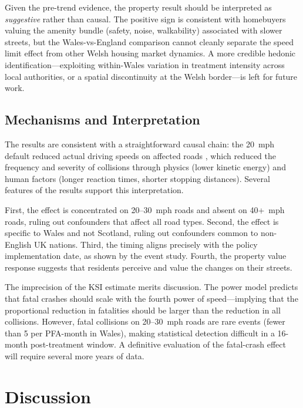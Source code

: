 \documentclass[12pt]{article}
\begin{document}
Given the pre-trend evidence, the property result should be interpreted as \textit{suggestive} rather than causal. The positive sign is consistent with homebuyers valuing the amenity bundle (safety, noise, walkability) associated with slower streets, but the Wales-vs-England comparison cannot cleanly separate the speed limit effect from other Welsh housing market dynamics. A more credible hedonic identification---exploiting within-Wales variation in treatment intensity across local authorities, or a spatial discontinuity at the Welsh border---is left for future work.

\subsection{Mechanisms and Interpretation}

The results are consistent with a straightforward causal chain: the 20~mph default reduced actual driving speeds on affected roads \citep{tfw2025}, which reduced the frequency and severity of collisions through physics (lower kinetic energy) and human factors (longer reaction times, shorter stopping distances). Several features of the results support this interpretation.

First, the effect is concentrated on 20--30~mph roads and absent on 40+~mph roads, ruling out confounders that affect all road types. Second, the effect is specific to Wales and not Scotland, ruling out confounders common to non-English UK nations. Third, the timing aligns precisely with the policy implementation date, as shown by the event study. Fourth, the property value response suggests that residents perceive and value the changes on their streets.

The imprecision of the KSI estimate merits discussion. The power model \citep{elvik2009, nilsson2004} predicts that fatal crashes should scale with the fourth power of speed---implying that the proportional reduction in fatalities should be larger than the reduction in all collisions. However, fatal collisions on 20--30~mph roads are rare events (fewer than 5 per PFA-month in Wales), making statistical detection difficult in a 16-month post-treatment window. A definitive evaluation of the fatal-crash effect will require several more years of data.


\section{Discussion}
\label{sec:discussion}
\end{document}
